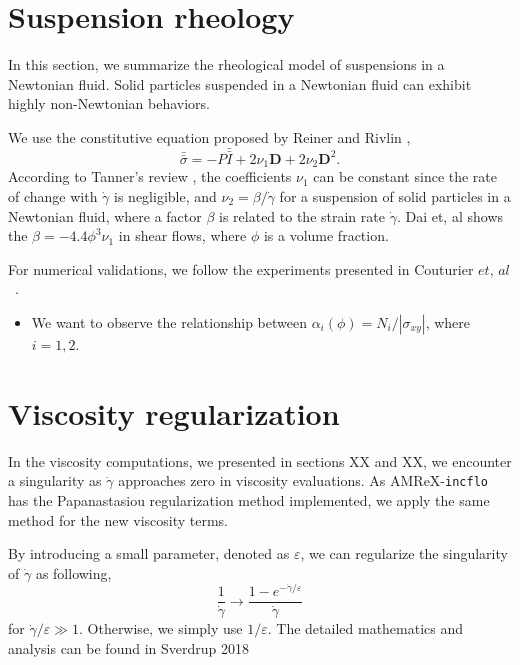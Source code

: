 \section{Suspension rheology}
In this section, we summarize the rheological model of suspensions in a Newtonian fluid. Solid particles suspended in a Newtonian fluid can exhibit highly non-Newtonian behaviors.  
\par
We use the constitutive equation proposed by Reiner \cite{reiner_mathematical_1945} and Rivlin \cite{rivlin_stress-deformation_1955},  
\begin{equation}
  \bar{\bar{\sigma}} = -P \bar{\bar{I}}
  + 2 \nu_1 {\bm{D}} + 2 \nu_2 {\bm{D}}^2.
\end{equation}
According to Tanner's review \cite{tanner_review_2018}, the coefficients $\nu_1$ can be constant since the rate of change with $\dot{\gamma}$ is negligible, and $\nu_2 = \beta / \dot{\gamma}$ for a suspension of solid particles in a Newtonian fluid, where a factor $\beta$ is related to the strain rate $\dot{\gamma}$. Dai et, al \cite{dai_viscometric_2013} shows the $\beta = -4.4 \phi^3 \nu_1$ in shear flows, where $\phi$ is a volume fraction. 
\par
For numerical validations, we follow the experiments presented in Couturier $\textit{et, al}$~\cite{couturier_suspensions_2011}.
\begin{itemize}
  \item We want to observe the relationship between $\alpha_i(\phi) = N_i / |\sigma_{xy}|$, where $i = 1,2$.
\end{itemize}

\section{Viscosity regularization}
In the viscosity computations, we presented in sections XX and XX, we encounter a singularity as $\dot{\gamma}$ approaches zero in viscosity evaluations. 
As AMReX-\verb+incflo+ has the Papanastasiou regularization method implemented, we apply the same method for the new viscosity terms.
\par
By introducing a small parameter, denoted as $\varepsilon$, we can regularize the singularity of $\dot{\gamma}$ as following,
\[
  \frac{1}{\dot{\gamma}} \rightarrow \frac{1-e^{-\dot{\gamma} / \varepsilon}}{\dot{\gamma}}  
\]
for $\dot{\gamma}/\varepsilon \gg 1$. Otherwise, we simply use $1/\varepsilon$. 
The detailed mathematics and analysis can be found in Sverdrup 2018~\cite{sverdrup_highly_2018}
